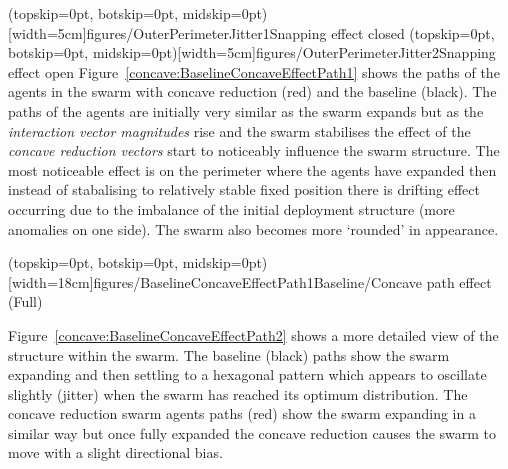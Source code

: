 \documentclass{ieeeaccess}
\begin{document}
\Figure[t!](topskip=0pt, botskip=0pt, midskip=0pt)[width=5cm]{figures/OuterPerimeterJitter1}{Snapping effect closed\label{fig:OuterPerimeterJitter1}}
\Figure[t!](topskip=0pt, botskip=0pt, midskip=0pt)[width=5cm]{figures/OuterPerimeterJitter2}{Snapping effect open\label{fig:OuterPerimeterJitter2}}
Figure~\ref{concave:BaselineConcaveEffectPath1} shows the paths of the agents in the swarm with concave reduction (red) and the baseline (black). The paths of the agents are initially very similar as the swarm expands but as the \textit{interaction vector magnitudes} rise and the swarm stabilises the effect of the \textit{concave reduction vectors} start to noticeably influence the swarm structure. The most noticeable effect is on the perimeter where the agents have expanded then instead of stabalising to relatively stable fixed position there is drifting effect occurring due to the imbalance of the initial deployment structure (more anomalies on one side). The swarm also becomes more `rounded' in appearance. 

\Figure[t!](topskip=0pt, botskip=0pt, midskip=0pt)[width=18cm]{figures/BaselineConcaveEffectPath1}{Baseline/Concave path effect (Full)\label{concave:BaselineConcaveEffectPath1}}

Figure~\ref{concave:BaselineConcaveEffectPath2} shows a more detailed view of the structure within the swarm. The baseline (black) paths show the swarm expanding and then settling to a hexagonal pattern which appears to oscillate slightly (jitter) when the swarm has reached its optimum distribution. The concave reduction swarm agents paths (red) show the swarm expanding in a similar way but once fully expanded the concave reduction causes the swarm to move with a slight directional bias.
\end{document}
